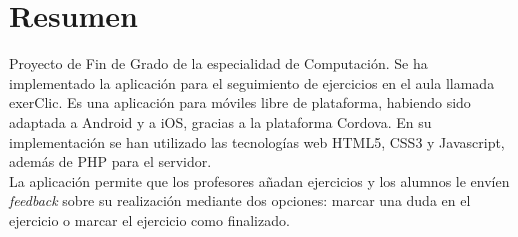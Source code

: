 \pagestyle{empty}

\section*{Resumen}

Proyecto de Fin de Grado de la especialidad de Computación. Se ha implementado la aplicación para el seguimiento de ejercicios en el aula llamada exerClic. Es una aplicación para móviles libre de plataforma, habiendo sido adaptada a Android y a iOS, gracias a la plataforma Cordova. En su implementación se han utilizado las tecnologías web HTML5, CSS3 y Javascript, además de PHP para el servidor.\\

La aplicación permite que los profesores añadan ejercicios y los alumnos le envíen \textit{feedback} sobre su realización mediante dos opciones: marcar una duda en el ejercicio o marcar el ejercicio como finalizado.\\